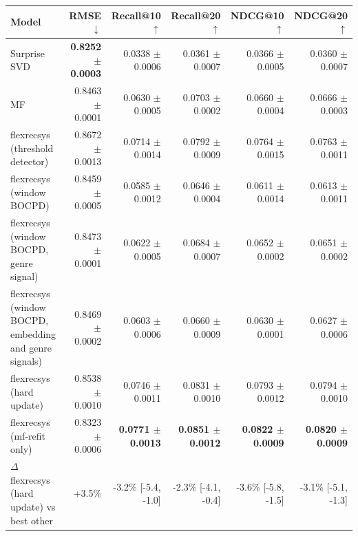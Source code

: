 \begin{tabular}{lrrrrr}
\toprule
Model & RMSE $\downarrow$ & Recall@10 $\uparrow$ & Recall@20 $\uparrow$ & NDCG@10 $\uparrow$ & NDCG@20 $\uparrow$ \\
\midrule
Surprise SVD & \textbf{0.8252 $\pm$ 0.0003} & 0.0338 $\pm$ 0.0006 & 0.0361 $\pm$ 0.0007 & 0.0366 $\pm$ 0.0005 & 0.0360 $\pm$ 0.0007 \\
MF & 0.8463 $\pm$ 0.0001 & 0.0630 $\pm$ 0.0005 & 0.0703 $\pm$ 0.0002 & 0.0660 $\pm$ 0.0004 & 0.0666 $\pm$ 0.0003 \\
flexrecsys (threshold detector) & 0.8672 $\pm$ 0.0013 & 0.0714 $\pm$ 0.0014 & 0.0792 $\pm$ 0.0009 & 0.0764 $\pm$ 0.0015 & 0.0763 $\pm$ 0.0011 \\
flexrecsys (window BOCPD) & 0.8459 $\pm$ 0.0005 & 0.0585 $\pm$ 0.0012 & 0.0646 $\pm$ 0.0004 & 0.0611 $\pm$ 0.0014 & 0.0613 $\pm$ 0.0011 \\
flexrecsys (window BOCPD, genre signal) & 0.8473 $\pm$ 0.0001 & 0.0622 $\pm$ 0.0005 & 0.0684 $\pm$ 0.0007 & 0.0652 $\pm$ 0.0002 & 0.0651 $\pm$ 0.0002 \\
flexrecsys (window BOCPD, embedding and genre signals) & 0.8469 $\pm$ 0.0002 & 0.0603 $\pm$ 0.0006 & 0.0660 $\pm$ 0.0009 & 0.0630 $\pm$ 0.0001 & 0.0627 $\pm$ 0.0006 \\
flexrecsys (hard update) & 0.8538 $\pm$ 0.0010 & 0.0746 $\pm$ 0.0011 & 0.0831 $\pm$ 0.0010 & 0.0793 $\pm$ 0.0012 & 0.0794 $\pm$ 0.0010 \\
flexrecsys (mf-refit only) & 0.8323 $\pm$ 0.0006 & \textbf{0.0771 $\pm$ 0.0013} & \textbf{0.0851 $\pm$ 0.0012} & \textbf{0.0822 $\pm$ 0.0009} & \textbf{0.0820 $\pm$ 0.0009} \\
\midrule
$\Delta$ flexrecsys (hard update) vs best other & +3.5\% & -3.2\% [-5.4, -1.0] & -2.3\% [-4.1, -0.4] & -3.6\% [-5.8, -1.5] & -3.1\% [-5.1, -1.3] \\
\bottomrule
\end{tabular}
